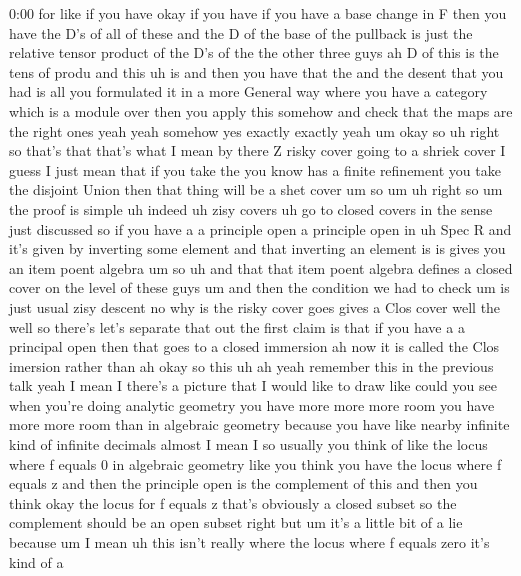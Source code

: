 \begin{unfinished}{0:00}
for  like  if  you  have  okay  if  you  have  if
you  have  a  base  change  in  F  then  you
have  the  D's  of  all  of  these  and  the  D
of  the  base  of  the  pullback  is  just  the
relative  tensor  product  of  the  D's  of
the  the  other  three  guys  ah  D  of  this  is
the  tens  of
produ  and  this
uh  is  and  then  you  have  that
the  and  the  desent  that  you  had  is  all
you  formulated  it  in  a  more  General  way
where  you  have  a  category  which  is  a
module  over  then  you  apply  this  somehow
and  check  that  the  maps  are  the  right
ones  yeah  yeah
somehow  yes  exactly  exactly  yeah  um  okay
so  uh  right  so  that's  that  that's  what  I
mean  by  there  Z  risky  cover  going  to  a
shriek  cover  I  guess  I  just  mean  that  if
you  take  the  you  know  has  a  finite
refinement  you  take  the  disjoint  Union
then  that  thing  will  be  a  shet
cover
um  so
um
uh  right  so  um  the  proof  is  simple  uh
indeed  uh  zisy
covers  uh  go  to  closed  covers  in  the
sense  just
discussed  so  if  you  have
a  a  principle  open  a  principle  open  in
uh  Spec  R  and  it's  given  by  inverting
some  element  and  that  inverting  an
element  is  is  gives  you  an  item  poent
algebra  um
so  uh  and  that  that  item  poent  algebra
defines  a  closed  cover  on  the  level  of
these
guys  um  and  then  the  condition  we  had  to
check  um  is  just  usual  zisy  descent  no
why  is  the  risky  cover  goes  gives  a  Clos
cover  well  the  well  so  there's  let's
separate  that  out  the  first  claim  is
that  if  you  have  a  a  principal  open  then
that  goes  to  a  closed
immersion  ah  now  it  is  called  the  Clos
imersion  rather  than  ah  okay  so  this
uh  ah  yeah  remember  this  in  the  previous
talk  yeah  I  mean  I  there's  a  picture
that  I  would  like  to
draw  like  could  you  see  when  you're
doing  analytic  geometry  you  have  more
more  more  room  you  have  more  more  room
than  in  algebraic  geometry  because  you
have  like  nearby  infinite  kind  of
infinite  decimals  almost  I  mean  I  so
usually  you  think  of  like  the  locus
where  f  equals  0  in  algebraic  geometry
like  you  think  you  have  the  locus  where
f  equals  z  and  then  the  principle  open
is  the  complement  of  this  and  then  you
think  okay  the  locus  for  f  equals  z
that's  obviously  a  closed  subset  so  the
complement  should  be  an  open  subset
right  but  um  it's  a  little  bit  of  a  lie
because
um  I  mean  uh  this  isn't  really  where  the
locus  where  f  equals  zero  it's  kind  of  a

\end{unfinished}
